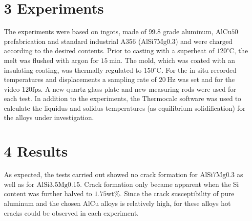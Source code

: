 \documentclass[10pt]{article}
\begin{document}
\section*{3 Experiments}
The experiments were based on ingots, made of 99.8 grade aluminum, $\mathrm{AlCu50}$ prefabrication and standard industrial A356 (AlSi7Mg0.3) and were charged according to the desired contents. Prior to casting with a superheat of $120^{\circ} \mathrm{C}$, the melt was flushed with argon for $15 \mathrm{~min}$. The mold, which was coated with an insulating coating, was thermally regulated to $150{ }^{\circ} \mathrm{C}$. For the in-situ recorded temperatures and displacements a sampling rate of $20 \mathrm{~Hz}$ was set and for the video $120 \mathrm{fps}$. A new quartz glass plate and new measuring rods were used for each test. In addition to the experiments, the Thermocalc software was used to calculate the liquidus and solidus temperatures (as equilibrium solidification) for the alloys under investigation.

\section*{4 Results}
As expected, the tests carried out showed no crack formation for $\mathrm{AlSi7Mg0.3}$ as well as for $\mathrm{AlSi3.5Mg0.15}$. Crack formation only became apparent when the Si content was further halved to $1.75 \mathrm{wt} \%$. Since the crack susceptibility of pure aluminum and the chosen $\mathrm{AlCu}$ alloys is relatively high, for these alloys hot cracks could be observed in each experiment.
\end{document}
